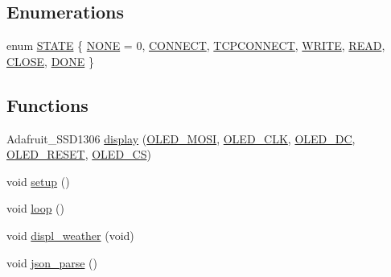 \subsection*{Enumerations}
\begin{DoxyCompactItemize}
\item 
enum \hyperlink{_weather__monitor_8ino_a275a67132f10277ada3a0ee3d616b647}{S\+T\+A\+TE} \{ \newline
\hyperlink{_weather__monitor_8ino_a275a67132f10277ada3a0ee3d616b647ac157bdf0b85a40d2619cbc8bc1ae5fe2}{N\+O\+NE} = 0, 
\hyperlink{_weather__monitor_8ino_a275a67132f10277ada3a0ee3d616b647a20391dd2915a0e64343d24c2f2e40b95}{C\+O\+N\+N\+E\+CT}, 
\hyperlink{_weather__monitor_8ino_a275a67132f10277ada3a0ee3d616b647a350c89c49d1096cfc697707cfc8a5b36}{T\+C\+P\+C\+O\+N\+N\+E\+CT}, 
\hyperlink{_weather__monitor_8ino_a275a67132f10277ada3a0ee3d616b647a61aa7ff70b76bff0fda378cf61d6afbc}{W\+R\+I\+TE}, 
\newline
\hyperlink{_weather__monitor_8ino_a275a67132f10277ada3a0ee3d616b647acb9be765f361bb7efb9073730aac92c6}{R\+E\+AD}, 
\hyperlink{_weather__monitor_8ino_a275a67132f10277ada3a0ee3d616b647a685f73194ad125cbc784c3210cdb3449}{C\+L\+O\+SE}, 
\hyperlink{_weather__monitor_8ino_a275a67132f10277ada3a0ee3d616b647a9c954bcf443428c80b0f107b3bc48749}{D\+O\+NE}
 \}
\end{DoxyCompactItemize}
\subsection*{Functions}
\begin{DoxyCompactItemize}
\item 
Adafruit\+\_\+\+S\+S\+D1306 \hyperlink{_weather__monitor_8ino_a1671c15ea8b66182fa3e462ac06caf2d}{display} (\hyperlink{_weather__monitor_8ino_a9065e33a0ffff5f88cb1bb46e2bb38f3}{O\+L\+E\+D\+\_\+\+M\+O\+SI}, \hyperlink{_weather__monitor_8ino_a8ada351153327868280ab3e62367f927}{O\+L\+E\+D\+\_\+\+C\+LK}, \hyperlink{_weather__monitor_8ino_ab92f2aedff7d366df56a26b3c9c9d795}{O\+L\+E\+D\+\_\+\+DC}, \hyperlink{_weather__monitor_8ino_a619e07239fb3b9b14d40646ab41d5b4f}{O\+L\+E\+D\+\_\+\+R\+E\+S\+ET}, \hyperlink{_weather__monitor_8ino_ab68a9b3dbffcafd9849e74c4998b8840}{O\+L\+E\+D\+\_\+\+CS})
\item 
void \hyperlink{_weather__monitor_8ino_a4fc01d736fe50cf5b977f755b675f11d}{setup} ()
\item 
void \hyperlink{_weather__monitor_8ino_afe461d27b9c48d5921c00d521181f12f}{loop} ()
\item 
void \hyperlink{_weather__monitor_8ino_ab1e637952f2337823090f6d093da4c12}{displ\+\_\+weather} (void)
\item 
void \hyperlink{_weather__monitor_8ino_a9fca7a32c7752a91c7f2b80ac424ae0e}{json\+\_\+parse} ()
\end{DoxyCompactItemize}
